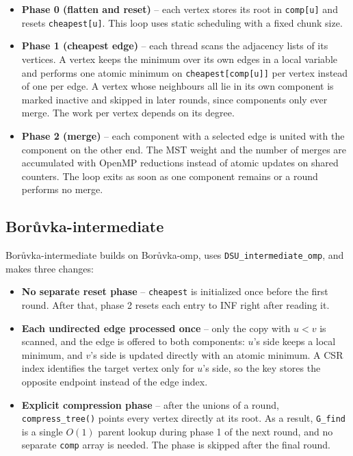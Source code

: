 \documentclass[11pt,a4paper]{article}
\begin{document}
\begin{itemize}
  \item \textbf{Phase 0 (flatten and reset)} -- each vertex stores its root in \texttt{comp[u]} and resets \texttt{cheapest[u]}. This loop uses static scheduling with a fixed chunk size.
  \item \textbf{Phase 1 (cheapest edge)} -- each thread scans the adjacency lists of its vertices. A vertex keeps the minimum over its own edges in a local variable and performs one atomic minimum on \texttt{cheapest[comp[u]]} per vertex instead of one per edge. A vertex whose neighbours all lie in its own component is marked inactive and skipped in later rounds, since components only ever merge. The work per vertex depends on its degree.
  \item \textbf{Phase 2 (merge)} -- each component with a selected edge is united with the component on the other end. The MST weight and the number of merges are accumulated with OpenMP reductions instead of atomic updates on shared counters. The loop exits as soon as one component remains or a round performs no merge.
\end{itemize}

\subsection*{Bor\r{u}vka-intermediate}
Bor\r{u}vka-intermediate builds on Bor\r{u}vka-omp, uses \texttt{DSU\_intermediate\_omp}, and makes three changes:

\begin{itemize}
  \item \textbf{No separate reset phase} -- \texttt{cheapest} is initialized once before the first round. After that, phase 2 resets each entry to INF right after reading it.
  \item \textbf{Each undirected edge processed once} -- only the copy with $u < v$ is scanned, and the edge is offered to both components: $u$'s side keeps a local minimum, and $v$'s side is updated directly with an atomic minimum. A CSR index identifies the target vertex only for $u$'s side, so the key stores the opposite endpoint instead of the edge index.
  \item \textbf{Explicit compression phase} -- after the unions of a round, \texttt{compress\_tree()} points every vertex directly at its root. As a result, \texttt{G\_find} is a single $O(1)$ parent lookup during phase 1 of the next round, and no separate \texttt{comp} array is needed. The phase is skipped after the final round.
\end{itemize}
\end{document}
